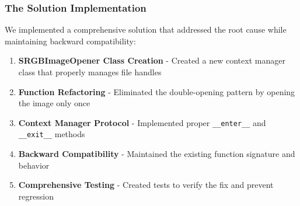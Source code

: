 \documentclass[11pt]{article}
\begin{document}
\subsubsection{The Solution Implementation}

We implemented a comprehensive solution that addressed the root cause while maintaining backward compatibility:

\begin{enumerate}
\item \textbf{SRGBImageOpener Class Creation} - Created a new context manager class that properly manages file handles
\item \textbf{Function Refactoring} - Eliminated the double-opening pattern by opening the image only once
\item \textbf{Context Manager Protocol} - Implemented proper \texttt{\_\_enter\_\_} and \texttt{\_\_exit\_\_} methods
\item \textbf{Backward Compatibility} - Maintained the existing function signature and behavior
\item \textbf{Comprehensive Testing} - Created tests to verify the fix and prevent regression
\end{enumerate}
\end{document}
